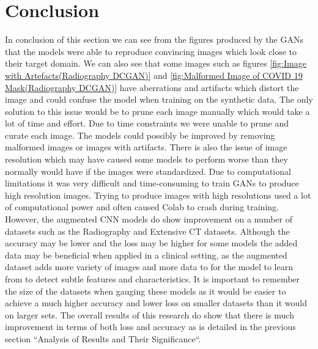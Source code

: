 \section{Conclusion}
In conclusion of this section we can see from the figures produced by the GANs that the models were able to reproduce convincing images which look close to their target domain.  We can also see that some images such as figures \ref{fig:Image with Artefacts(Radiography DCGAN)} and \ref{fig:Malformed Image of COVID 19 Mask(Radiography DCGAN)} have aberrations and artifacts which distort the image and could confuse the model when training on the synthetic data.  The only solution to this issue would be to prune each image manually which would take a lot of time and effort.  Due to time constraints we were unable to prune and curate each image.  The models could possibly be improved by removing malformed images or images with artifacts.  There is also the issue of image resolution which may have caused some models to perform worse than they normally would have if the images were standardized.  Due to computational limitations it was very difficult and time-consuming to train GANs to produce high resolution images.  Trying to produce images with high resolutions used a lot of computational power and often caused Colab to crash during training.  However, the augmented CNN models do show improvement on a number of datasets such as the Radiography and Extensive CT datasets.  Although the accuracy may be lower and the loss may be higher for some models the added data may be beneficial when applied in a clinical setting, as the augmented dataset adds more variety of images and more data to for the model to learn from to detect subtle features and characteristics.  It is important to remember the size of the datasets when gauging these models as it would be easier to achieve a much higher accuracy and lower loss on smaller datasets than it would on larger sets.  The overall results of this research do show that there is much improvement in terms of both loss and accuracy as is detailed in the previous section ``Analysis of Results and Their Significance``.